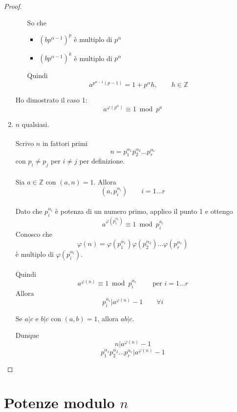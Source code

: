 \documentclass[a4paper,12pt, oneside]{book}
\begin{document}
\begin{teorema}
\begin{proof}
\begin{enumerate}
\begin{enumerate}[label=\Roman*) ]
				            So che \begin{itemize}
					            \item $(bp^{\alpha-1})^p$ è multiplo di $p^\alpha$
					            \item $(b p^{\alpha-1})^k$ è multiplo di $p^\alpha$
				            \end{itemize}
				            Quindi
				            $$a^{p^{\alpha-1} (p-1)} = 1+p^\alpha h, \qquad h \in \mathbb{Z}$$
			      \end{enumerate}
			      Ho dimostrato il caso 1: $$a^{\varphi(p^\alpha)} \equiv 1 \bmod p^a$$
			\item $n$ qualsiasi.\\\\
			      Scrivo $n$ in fattori primi
			      $$n = p_1^{\alpha_1} p_2^{\alpha_2} \dots p_r^{\alpha_r}$$
			      con $p_i \not= p_j$ per $i \not= j$ per definizione.\\\\
			      Sia $a \in \mathbb{Z}$ con $(a,n)=1$.
			      Allora $$(a, p_i^{\alpha_i}) \qquad i=1 \dots r$$\\
			      Dato che $p_i^{\alpha_i}$ è potenza di un numero primo, applico il punto 1 e ottengo
			      $$a^{\varphi(p_i^{\alpha_i})} \equiv 1 \bmod p_i^{a_i}$$
			      Conosco che
			      $$\varphi(n) = \varphi(p_1^{\alpha_1}) \varphi(p_2^{\alpha_2}) \dots \varphi(p_r^{\alpha_r})$$
			      è multiplo di $\varphi(p_i^{\alpha_i})$.\\\\
			      Quindi
			      $$a^{\varphi(n)} \equiv 1 \bmod p_i^{\alpha_i} \qquad \mbox{ per } i = 1 \dots r$$
			      Allora
			      $$p_i^{\alpha_i} | a^{\varphi(n)}-1 \qquad \forall i$$
			      \begin{nota}
				      Se $a|c$ e $b|c$ con $(a,b)=1$, allora $ab|c$.
			      \end{nota}
			      Dunque
			      $$n | a^{\varphi(n)} -1$$
			      $$p_1^{\alpha_1} p_2^{\alpha_2} \dots p_r^{\alpha_r} | a^{\varphi(n)} -1$$
		\end{enumerate}
	\end{proof}
\end{teorema}


\chapter{Potenze modulo $n$}
\end{document}
